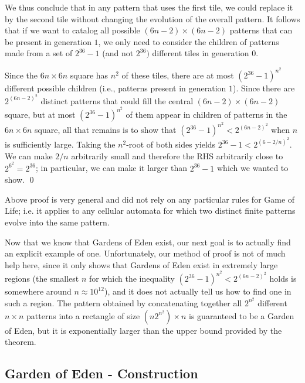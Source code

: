We thus conclude that in any pattern that uses the first tile, we could replace it by the second tile without changing the evolution of the overall pattern. It follows that if we want to catalog all possible $(6n - 2) \times (6n - 2)$ patterns that can be present in generation $1$, we only need to consider the children of patterns made from a set of $2^{36} - 1$ (and not $2^{36})$ different tiles in generation $0$.

Since the $6n \times 6n$ square has $n^2$ of these tiles, there are at most $(2^{36} - 1)^{n^2}$ different possible  children (i.e., patterns present in generation $1$). Since there are $2^{(6n - 2)^2}$ distinct patterns that could fill the central $(6n - 2) \times (6n - 2)$ square, but at most $(2^{36} - 1)^{n^2}$ of them appear in children of patterns in the $6n \times 6n$ square, all that remains is to show that $(2^{36} - 1)^{n^2} < 2^{(6n - 2)^2}$ when $n$ is sufficiently large. Taking the $n^2$-root of both sides yields $2^{36} - 1 < 2^{(6 - 2/n)^2}$. We can make $2/n$ arbitrarily small and therefore the RHS arbitrarily close to $2^{6^2} = 2^{36}$; in particular, we can make it larger than $2^{36} - 1$ which we wanted to show. \qed

Above proof is very general and did not rely on any particular rules for Game of Life; i.e. it applies to any cellular automata for which two distinct finite patterns evolve into the same pattern.

Now that we know that Gardens of Eden exist, our next goal is to actually find an explicit example of one. Unfortunately, our method of proof is not of much help here, since it only shows that Gardens of Eden exist in extremely large regions (the smallest $n$ for which the inequality $(2^{36} - 1)^{n^2} < 2^{(6n-2)^2}$ holds is somewhere around $n \approx 10^{12}$), and it does not actually tell us how to find one in such a region. The pattern obtained by concatenating together all $2^{n^2}$ different $n \times n$ patterns into a rectangle of size $(n 2^{n^2}) \times n$ is guaranteed to be a Garden of Eden, but it is exponentially larger than the upper bound provided by the theorem.

\subsection{Garden of Eden - Construction}






